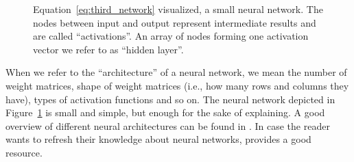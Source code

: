 \begin{figure}[!htb]
    \centering
    
    \caption{Equation~\ref{eq:third_network} visualized, a small neural network. The nodes between input and output represent intermediate results and are called \enquote{activations}. An array of nodes forming one activation vector we refer to as \enquote{hidden layer}.}
\label{fig:third_network}
\end{figure}

\noindent When we refer to the \enquote{architecture} of a neural network, we mean the number of weight matrices, shape of weight matrices (i.e., how many rows and columns they have), types of activation functions and so on. The neural network depicted in Figure~\ref{fig:third_network} is small and simple, but enough for the sake of explaining. A good overview of different neural architectures can be found in \cite{leijnen2020neural}. In case the reader wants to refresh their knowledge about neural networks, \cite{goodfellow2016deep} provides a good resource.

